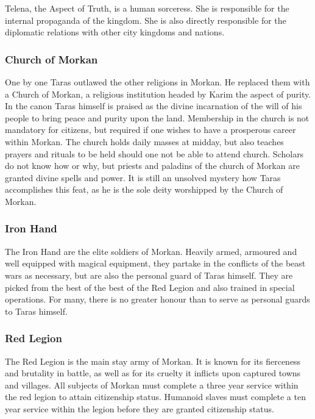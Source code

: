 Telena, the Aspect of Truth, is a human sorceress. She is responsible for the
internal propaganda of the kingdom. She is also directly responsible for the
diplomatic relations with other city kingdoms and nations.

\subsubsection{Church of Morkan}
\label{sec:Church of Morkan}

One by one Taras outlawed the other religions in Morkan. He replaced them with
a Church of Morkan, a religious institution headed by Karim the aspect of
purity. In the canon Taras himself is praised as the divine incarnation of the
will of his people to bring peace and purity upon the land. Membership in the
church is not mandatory for citizens, but required if one wishes to have a
prosperous career within Morkan. The church holds daily masses at midday, but
also teaches prayers and rituals to be held should one not be able to attend
church. Scholars do not know how or why, but priests and paladins of the
church of Morkan are granted divine spells and power. It is still an unsolved
mystery how Taras accomplishes this feat, as he is the sole deity worshipped
by the Church of Morkan.

\subsubsection{Iron Hand}
\label{sec:Iron Hand}

The Iron Hand are the elite soldiers of Morkan. Heavily armed, armoured and
well equipped with magical equipment, they partake in the conflicts of the
beast wars as necessary, but are also the personal guard of Taras
himself. They are picked from the best of the best of the Red Legion and also
trained in special operations. For many, there is no greater honour than to
serve as personal guards to Taras himself.

\subsubsection{Red Legion}
\label{sec:Red Legion}

The Red Legion is the main stay army of Morkan. It is known for its
fierceness and brutality in battle, as well as for its cruelty it inflicts
upon captured towns and villages. All subjects of Morkan must complete a
three year service within the red legion to attain citizenship status. Humanoid
slaves must complete a ten year service within the legion before they are
granted citizenship status.

